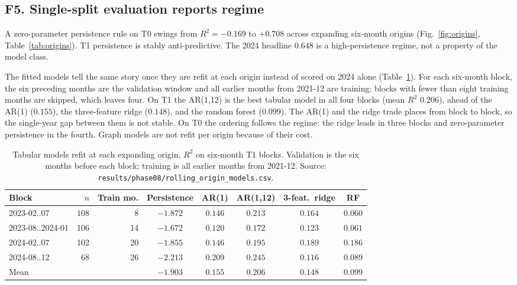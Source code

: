 \documentclass[10pt]{article}
\begin{document}
\subsection{F5. Single-split evaluation reports regime}
\label{sec:roll}

A zero-parameter persistence rule on T0 swings from $R^2=-0.169$ to $+0.708$ across expanding six-month origins (Fig.~\ref{fig:origins}, Table~\ref{tab:origins}). T1 persistence is stably anti-predictive. The 2024 headline $0.648$ is a high-persistence regime, not a property of the model class.

The fitted models tell the same story once they are refit at each origin instead of scored on 2024 alone (Table~\ref{tab:rollmodels}). For each six-month block, the six preceding months are the validation window and all earlier months from 2021-12 are training; blocks with fewer than eight training months are skipped, which leaves four. On T1 the AR(1,12) is the best tabular model in all four blocks (mean $R^2$ $0.206$), ahead of the AR(1) ($0.155$), the three-feature ridge ($0.148$), and the random forest ($0.099$). The AR(1) and the ridge trade places from block to block, so the single-year gap between them is not stable. On T0 the ordering follows the regime: the ridge leads in three blocks and zero-parameter persistence in the fourth. Graph models are not refit per origin because of their cost.

\begin{table}[t]
\centering
\caption{Tabular models refit at each expanding origin, $R^2$ on six-month T1 blocks. Validation is the six months before each block; training is all earlier months from 2021-12. Source: \texttt{results/phase08/rolling\_origin\_models.csv}.}
\label{tab:rollmodels}
\footnotesize
\begin{tabular}{l r r c ccc c}
\toprule
\textbf{Block} & $n$ & \textbf{Train mo.} & \textbf{Persistence} & \textbf{AR(1)} & \textbf{AR(1,12)} & \textbf{3-feat.\ ridge} & \textbf{RF} \\
\midrule
2023-02..07 & 108 & 8 & $-1.872$ & $0.146$ & $\mathbf{0.213}$ & $0.164$ & $0.060$ \\
2023-08..2024-01 & 106 & 14 & $-1.672$ & $0.120$ & $\mathbf{0.172}$ & $0.123$ & $0.061$ \\
2024-02..07 & 102 & 20 & $-1.855$ & $0.146$ & $\mathbf{0.195}$ & $0.189$ & $0.186$ \\
2024-08..12 & 68 & 26 & $-2.213$ & $0.209$ & $\mathbf{0.245}$ & $0.116$ & $0.089$ \\
\midrule
Mean & & & $-1.903$ & $0.155$ & $\mathbf{0.206}$ & $0.148$ & $0.099$ \\
\bottomrule
\end{tabular}
\end{table}
\end{document}
